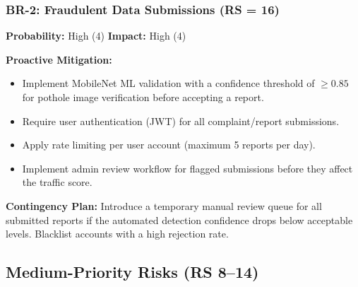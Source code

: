 \documentclass[12pt,a4paper]{article}
\begin{document}
\subsubsection*{BR-2: Fraudulent Data Submissions (RS = 16)}
\textbf{Probability:} High (4) \quad \textbf{Impact:} High (4)

\textbf{Proactive Mitigation:}
\begin{itemize}[noitemsep]
    \item Implement MobileNet ML validation with a confidence threshold of $\geq 0.85$ for pothole image verification before accepting a report.
    \item Require user authentication (JWT) for all complaint/report submissions.
    \item Apply rate limiting per user account (maximum 5 reports per day).
    \item Implement admin review workflow for flagged submissions before they affect the traffic score.
\end{itemize}

\textbf{Contingency Plan:}
Introduce a temporary manual review queue for all submitted reports if the automated detection confidence drops below acceptable levels. Blacklist accounts with a high rejection rate.

\subsection{Medium-Priority Risks (RS 8--14)}
\end{document}
